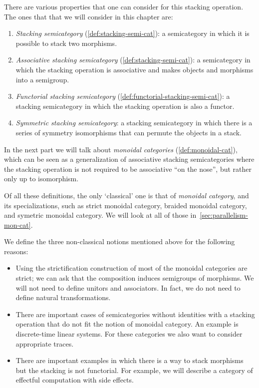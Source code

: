 There are various properties that one can consider for this stacking operation.
The ones that that we will consider in this chapter are:
%
\begin{enumerate}
    \item \emph{Stacking semicategory} (\cref{def:stacking-semi-cat}): a semicategory in which  it is possible to stack two morphisms.
    \item \emph{Associative stacking semicategory} (\cref{def:stacking-semi-cat}): a semicategory in which the stacking operation is associative and makes objects and morphisms into a semigroup.
    \item \emph{Functorial stacking semicategory} (\cref{def:functorial-stacking-semi-cat}): a stacking semicategory in which the stacking operation is also a functor.
    \item \emph{Symmetric stacking semicategory}: a stacking semicategory in which there is a series of symmetry isomorphisms that can permute the objects in a stack.
\end{enumerate}
%
In the next part we will talk about \emph{monoidal categories} (\cref{def:monoidal-cat}), which can be seen as a generalization of associative stacking semicategories where the stacking operation is not required to be associative ``on the nose'', but rather only up to isomorphism.

\begin{remark}
    Of all these definitions, the only `classical' one is that of \emph{monoidal category}, and its specializations, such as strict monoidal category, braided monoidal category, and symetric monoidal category.
    We will look at all of those in~\cref{sec:parallelism-mon-cat}.

    We define the three non-classical notions mentioned above for the following reasons:
    \begin{itemize}
        \item Using the strictification construction of \SetL most of the monoidal categories are strict; we can ask that the composition induces semigroups of morphisms.
              We will not need to define unitors and associators.
              In fact, we do not need to define natural transformations.
        \item There are important cases of semicategories without identities with a stacking operation that do not fit the notion of monoidal category.
              An example is discrete-time linear systems.
              For these categories we also want to consider appropriate traces.
        \item There are important examples in which there is a way to stack morphisms but the stacking is not functorial.
              For example, we will describe a category of effectful computation with side effects.
    \end{itemize}
\end{remark}

